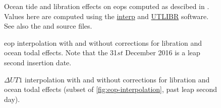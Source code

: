 \begin{figure}[h]
  \centering
  
  \caption{Ocean tide and libration effects on \glspl{eop} computed as descibed in \cite{iers2010}. 
    Values here are computed using the \protect\href{https://hpiers.obspm.fr/iers/models/interp.f}{interp} and 
    \protect\href{https://iers-conventions.obspm.fr/content/chapter5/software/UTLIBR.F}{UTLIBR} software. 
    See also the  and  
    source files.}
  \label{fig:eop-variations}
\end{figure}

\begin{figure}[h]
  \centering
  
  \caption{\gls{eop} interpolation with and without corrections for libration and ocean todal effects. Note that the 31$st$ December 2016 is a leap second insertion date.}
  \label{fig:eop-interpolation}
\end{figure}

\begin{figure}[h]
  \centering
  
  \caption{$\Delta UT1$ interpolation with and without corrections for libration and ocean todal effects (subset of \autoref{fig:eop-interpolation}, past leap second day).}
  \label{fig:eop-interpolation-dut1}
\end{figure}

\begin{minipage}{\linewidth}
  
\end{minipage}
